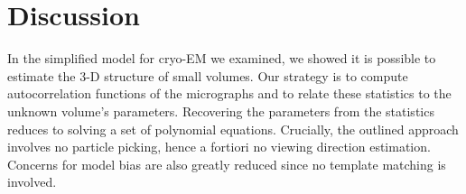 \documentclass[english,11pt]{article}
\newcommand{\1}{\mathbf{1}}
\newcommand{\TODO}[1]{{\color{red}{[#1]}}}
\numberwithin{equation}{section}
\theoremstyle{plain}
\theoremstyle{definition}
\theoremstyle{remark}
\theoremstyle{plain}
\theoremstyle{remark}
\theoremstyle{plain}
\theoremstyle{plain}
\newcommand{\SNR}{\ensuremath{\textsf{SNR}}}
\begin{document}
%
%

%



\clearpage
\section{Discussion}


In the simplified model for cryo-EM we examined, we showed it is possible to estimate the 3-D structure of small volumes. 
Our strategy is to compute autocorrelation functions of the micrographs and to relate these statistics to the unknown volume's parameters. Recovering the parameters from the statistics reduces to solving a set of polynomial equations.
Crucially, the outlined approach involves no particle picking, hence a fortiori no viewing direction estimation. Concerns for model bias are also greatly reduced since no template matching is involved.
\end{document}
